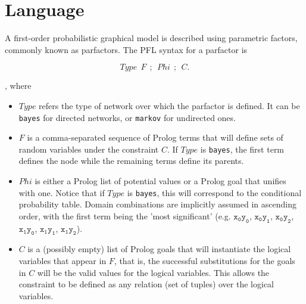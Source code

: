 \documentclass{article}
\begin{document}
\section{Language}
A first-order probabilistic graphical model is described using parametric factors, commonly known as parfactors. The PFL syntax for a parfactor is

$$Type~~F~~;~~Phi~~;~~C.$$

, where
\begin{itemize}
\item $Type$ refers the type of network over which the parfactor is defined. It can be \texttt{bayes} for directed networks, or \texttt{markov} for undirected ones.

\item $F$ is a comma-separated sequence of Prolog terms that will define sets of random variables under the constraint $C$. If $Type$ is \texttt{bayes}, the first term defines the node while the remaining terms define its parents.

\item $Phi$ is either a Prolog list of potential values or a Prolog goal that unifies with one. Notice that if $Type$ is \texttt{bayes}, this will correspond to the conditional probability table. Domain combinations are implicitly assumed in ascending order, with the first term being the 'most significant' (e.g. $\mathtt{x_0y_0}$, $\mathtt{x_0y_1}$, $\mathtt{x_0y_2}$, $\mathtt{x_1y_0}$, $\mathtt{x_1y_1}$, $\mathtt{x_1y_2}$).

\item $C$ is a (possibly empty) list of Prolog goals that will instantiate the logical variables that appear in $F$, that is, the successful substitutions for the goals in $C$ will be the valid values for the logical variables. This allows the constraint to be defined as any relation (set of tuples) over the logical variables.
\end{itemize}
\end{document}
